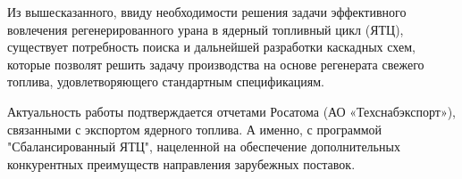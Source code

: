 Из вышесказанного, ввиду необходимости решения задачи эффективного вовлечения регенерированного урана в ядерный топливный цикл (ЯТЦ), существует потребность поиска и дальнейшей разработки каскадных схем, которые позволят решить задачу производства на основе регенерата свежего топлива, удовлетворяющего стандартным спецификациям.

Актуальность работы подтверждается отчетами Росатома (АО «Техснабэкспорт»), связанными с экспортом ядерного топлива. А  именно, с программой "Сбалансированный ЯТЦ", нацеленной на обеспечение дополнительных конкурентных преимуществ направления зарубежных поставок.


